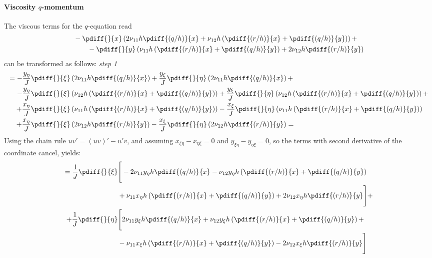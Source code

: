 \paragraph*{Viscosity $q$-momentum}
The viscous terms for the $q$-equation read
\begin{align}
    &-\pdiff{}{x} \left( 2 \nu_{11} h \pdiff{(q/h)}{x}
    + \nu_{12} h \left(\pdiff{(r/h)}{x} + \pdiff{(q/h)}{y}\right) \right) +
    \\
    &\qquad
    - \pdiff{}{y} \left( \nu_{11} h \left( \pdiff{(r/h)}{x} + \pdiff{(q/h)}{y} \right) + 2 \nu_{12} h \pdiff{(r/h)}{y} \right)
\end{align}
can be transformed as follows: \newline
\textit{step 1}
\begin{align}
=
- \frac{y_{\eta}}{J} \pdiff{}{\xi} & \left( 2\nu_{11} h\pdiff{(q/h)}{x} \right)
+ \frac{y_{\xi}}{J} \pdiff{}{\eta}\left(2\nu_{11} h\pdiff{(q/h)}{x} \right) +
\\
- \frac{y_{\eta}}{J} \pdiff{}{\xi} & \left( \nu_{12} h \left(\pdiff{(r/h)}{x} + \pdiff{(q/h)}{y}\right) \right)
+ \frac{y_{\xi}}{J} \pdiff{}{\eta} \left( \nu_{12} h \left(\pdiff{(r/h)}{x} + \pdiff{(q/h)}{y}\right) \right) +
\\
+ \frac{x_{\eta}}{J}\pdiff{}{\xi} & \left( \nu_{11} h \left( \pdiff{(r/h)}{x} + \pdiff{(q/h)}{y} \right)\right)
- \frac{x_{\xi}}{J} \pdiff{}{\eta}\left( \nu_{11} h \left( \pdiff{(r/h)}{x} + \pdiff{(q/h)}{y} \right)\right)
\\
+ \frac{x_{\eta}}{J}\pdiff{}{\xi} & \left( 2 \nu_{12} h \pdiff{(r/h)}{y} \right)
- \frac{x_{\xi}}{J} \pdiff{}{\eta}\left( 2 \nu_{12} h \pdiff{(r/h)}{y} \right)
=
\end{align}
Using the chain rule $uv' = (uv)' - u'v$, and assuming $x_{\xi\eta} - x_{\eta\xi} = 0$ and $y_{\xi\eta} - y_{\eta\xi} = 0$, so the terms with second derivative of the coordinate cancel, yields:
%
\begin{align}
    =
     \frac{1}{J} \pdiff{}{\xi} & \Bigg[
     -2\nu_{11} y_{\eta} h\pdiff{(q/h)}{x}
    - \nu_{12} y_{\eta} h \left(\pdiff{(r/h)}{x} + \pdiff{(q/h)}{y}\right)
    \\
    &
    + \nu_{11} x_\eta h \left( \pdiff{(r/h)}{x} + \pdiff{(q/h)}{y} \right)
    + 2 \nu_{12} x_{\eta} h \pdiff{(r/h)}{y}
    \Bigg] +
    \\
    + \frac{1}{J} \pdiff{}{\eta} &\Bigg[ 2\nu_{11} y_{\xi} h \pdiff{(q/h)}{x}
    + \nu_{12} y_{\xi} h \left(\pdiff{(r/h)}{x} + \pdiff{(q/h)}{y}\right) +
    \\
    &
    -  \nu_{11} x_\xi h \left(\pdiff{(r/h)}{x} + \pdiff{(q/h)}{y} \right)
    -  2 \nu_{12} x_{\xi} h \pdiff{(r/h)}{y}
    \Bigg]
\end{align}
